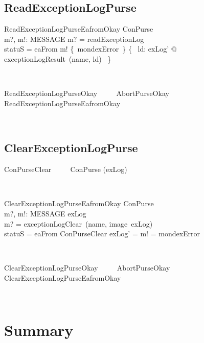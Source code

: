 \subsection{ReadExceptionLogPurse}

\begin{LSDef}
\begin{schema}{ReadExceptionLogPurseEafromOkay}
   \Xi ConPurse \\
   m?, m!: MESSAGE
\where
   m? = readExceptionLog \\
   statuS = eaFrom
   \also
   m! \in \{~mondexError~\} \cup \{~ ld: exLog' @ exceptionLogResult~(name, ld) ~\}
\end{schema}~\end{LSDef}

\begin{LSDef}
\begin{zed}
   ReadExceptionLogPurseOkay ~~~~ AbortPurseOkay \semi ReadExceptionLogPurseEafromOkay
\end{zed}~\end{LSDef}

\subsection{ClearExceptionLogPurse}

\begin{LSDef}
\begin{zed}
   ConPurseClear ~~~~ ConPurse \hide (exLog)
\end{zed}~\end{LSDef}

\begin{LSDef}
\begin{schema}{ClearExceptionLogPurseEafromOkay}
   \Delta ConPurse \\
   m?, m!: MESSAGE
\where
   exLog \neq \emptyset \\
   m? = exceptionLogClear~(name, image~exLog) \\
   statuS = eaFrom
   \also
   \Xi ConPurseClear
   \also
   exLog' = \emptyset
   \also
   m! = mondexError
\end{schema}~\end{LSDef}

\begin{LSDef}
\begin{zed}
   ClearExceptionLogPurseOkay ~~~~ AbortPurseOkay \semi ClearExceptionLogPurseEafromOkay
\end{zed}~\end{LSDef}

\newpage

\section{Summary}\label{ch4.summary}

\ldefsummary %
\lthmsummary %
\lthmaddeddefsummary %
\lthmaddedthmsummary %
\lzevessummary %
